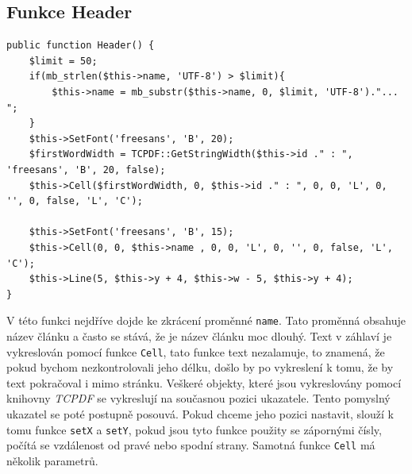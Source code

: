 \documentclass[czech,BP]{thesiskiv}
\begin{document}
\subsection{Funkce Header}
\label{lst:Header}
\begin{lstlisting}
public function Header() {
	$limit = 50;
	if(mb_strlen($this->name, 'UTF-8') > $limit){
		$this->name = mb_substr($this->name, 0, $limit, 'UTF-8')."... ";
	} 
	$this->SetFont('freesans', 'B', 20);
	$firstWordWidth = TCPDF::GetStringWidth($this->id ." : ", 'freesans', 'B', 20, false);
	$this->Cell($firstWordWidth, 0, $this->id ." : ", 0, 0, 'L', 0, '', 0, false, 'L', 'C');
	
	$this->SetFont('freesans', 'B', 15);
	$this->Cell(0, 0, $this->name , 0, 0, 'L', 0, '', 0, false, 'L', 'C');
	$this->Line(5, $this->y + 4, $this->w - 5, $this->y + 4);
}
\end{lstlisting}
V této funkci nejdříve dojde ke zkrácení proměnné \texttt{name}. Tato proměnná obsahuje název článku a často se stává, že je název článku moc dlouhý. Text v záhlaví je vykreslován pomocí funkce \texttt{Cell}, tato funkce text nezalamuje, to znamená, že pokud bychom nezkontrolovali jeho délku, došlo by po vykreslení k tomu, že by text pokračoval i mimo stránku. Veškeré objekty, které jsou vykreslovány pomocí knihovny \emph{TCPDF} se vykreslují na současnou pozici ukazatele. Tento pomyslný ukazatel se poté postupně posouvá. Pokud chceme jeho pozici nastavit, slouží k tomu funkce \texttt{setX} a \texttt{setY}, pokud jsou tyto funkce použity se zápornými čísly, počítá se vzdálenost od pravé nebo spodní strany. Samotná funkce \texttt{Cell} má několik parametrů. 
\end{document}
